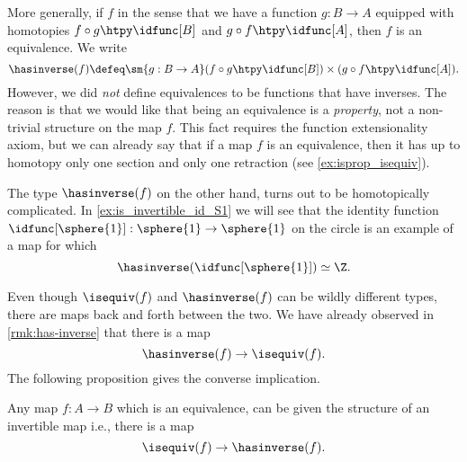 \begin{rmk}\label{rmk:has-inverse}
  More generally, if $f$  in the sense that we have a function $g:B\to A$ equipped with homotopies $f\circ g\htpy\idfunc[B]$ and $g\circ f\htpy\idfunc[A]$, then $f$ is an equivalence. We write
  \begin{equation*}
    \hasinverse(f)\defeq\sm{g:B\to A} (f\circ g\htpy \idfunc[B])\times (g\circ f\htpy\idfunc[A]).
  \end{equation*}
  However, we did \emph{not} define equivalences to be functions that have inverses. The reason is that we would like that being an equivalence is a \emph{property}, not a non-trivial structure on the map $f$. This fact requires the function extensionality axiom, but we can already say that if a map $f$ is an equivalence, then it has up to homotopy only one section and only one retraction (see \cref{ex:isprop_isequiv}).

  The type $\hasinverse(f)$ on the other hand, turns out to be homotopically complicated. In \cref{ex:is_invertible_id_S1} we will see that the identity function $\idfunc[\sphere{1}]:\sphere{1}\to\sphere{1}$ on the circle is an example of a map for which
  \begin{equation*}
    \hasinverse(\idfunc[\sphere{1}])\simeq \Z.
  \end{equation*}
\end{rmk}

Even though $\isequiv(f)$ and $\hasinverse(f)$ can be wildly different types, there are maps back and forth between the two. We have already observed in \cref{rmk:has-inverse} that there is a map
\begin{equation*}
  \hasinverse(f)\to\isequiv(f).
\end{equation*}
The following proposition gives the converse implication.

\begin{prp}\label{lem:inv_equiv}
  Any map $f:A\to B$ which is an equivalence, can be given the structure of an invertible map i.e., there is a map
  \begin{equation*}
    \isequiv(f)\to\hasinverse(f).
  \end{equation*}
\end{prp}

